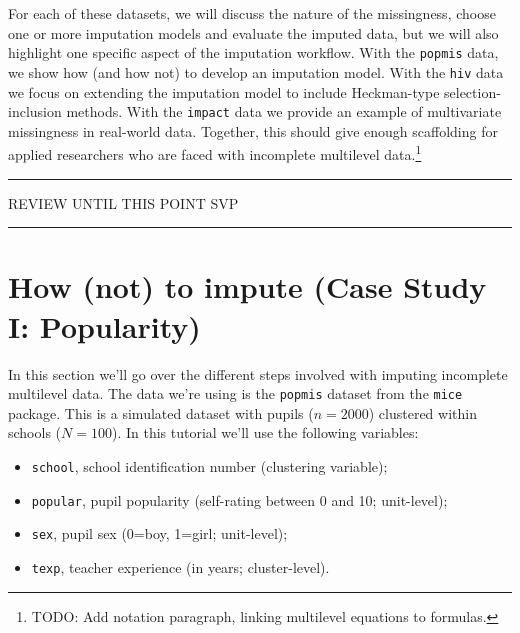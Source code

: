 \documentclass[
]{jss}
\providecommand{\tightlist}{%
  \setlength{\itemsep}{0pt}\setlength{\parskip}{0pt}}
\begin{document}
For each of these datasets, we will discuss the nature of the
missingness, choose one or more imputation models and evaluate the
imputed data, but we will also highlight one specific aspect of the
imputation workflow. With the \texttt{popmis} data, we show how (and how
not) to develop an imputation model. With the \texttt{hiv} data we focus
on extending the imputation model to include Heckman-type
selection-inclusion methods. With the \texttt{impact} data we provide an
example of multivariate missingness in real-world data. Together, this
should give enough scaffolding for applied researchers who are faced
with incomplete multilevel data.\footnote{TODO: Add notation paragraph,
  linking multilevel equations to  formulas.}

\begin{center}\rule{0.5\linewidth}{0.5pt}\end{center}

\begin{center}
REVIEW UNTIL THIS POINT SVP
\end{center}

\begin{center}\rule{0.5\linewidth}{0.5pt}\end{center}

\hypertarget{how-not-to-impute-case-study-i-popularity}{%
\section{How (not) to impute (Case Study I:
Popularity)}\label{how-not-to-impute-case-study-i-popularity}}

In this section we'll go over the different steps involved with imputing
incomplete multilevel data. The data we're using is the \texttt{popmis}
dataset from the \texttt{mice} package. This is a simulated dataset with
pupils (\(n = 2000\)) clustered within schools (\(N = 100\)). In this
tutorial we'll use the following variables:

\begin{itemize}
\tightlist
\item
  \texttt{school}, school identification number (clustering variable);
\item
  \texttt{popular}, pupil popularity (self-rating between 0 and 10;
  unit-level);
\item
  \texttt{sex}, pupil sex (0=boy, 1=girl; unit-level);
\item
  \texttt{texp}, teacher experience (in years; cluster-level).
\end{itemize}
\end{document}
